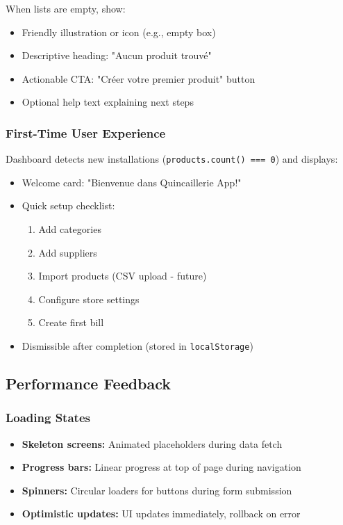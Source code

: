 When lists are empty, show:

\begin{itemize}
    \item Friendly illustration or icon (e.g., empty box)
    \item Descriptive heading: "Aucun produit trouvé"
    \item Actionable CTA: "Créer votre premier produit" button
    \item Optional help text explaining next steps
\end{itemize}

\subsubsection{First-Time User Experience}

Dashboard detects new installations (\texttt{products.count() === 0}) and displays:

\begin{itemize}
    \item Welcome card: "Bienvenue dans Quincaillerie App!"
    \item Quick setup checklist:
    \begin{enumerate}
        \item Add categories
        \item Add suppliers
        \item Import products (CSV upload - future)
        \item Configure store settings
        \item Create first bill
    \end{enumerate}
    \item Dismissible after completion (stored in \texttt{localStorage})
\end{itemize}

\subsection{Performance Feedback}

\subsubsection{Loading States}

\begin{itemize}
    \item \textbf{Skeleton screens:} Animated placeholders during data fetch
    \item \textbf{Progress bars:} Linear progress at top of page during navigation
    \item \textbf{Spinners:} Circular loaders for buttons during form submission
    \item \textbf{Optimistic updates:} UI updates immediately, rollback on error
\end{itemize}

